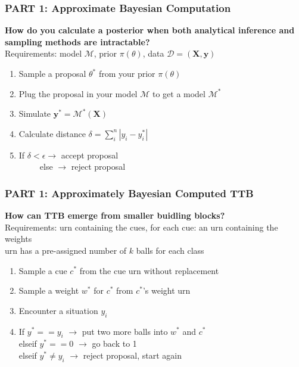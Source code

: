 \documentclass{beamer}
\begin{document}
\begin{frame}
 \frametitle{PART 1: Approximate Bayesian Computation}
\textbf{How do you calculate a posterior when both analytical inference and sampling methods are intractable?}\medskip\\
Requirements: model $\mathcal{M}$, prior $\pi(\theta)$, data $\mathcal{D}=(\mathbf{X},\mathbf{y})$
\begin{enumerate}
\item Sample a proposal $\theta^*$ from your prior $\pi(\theta)$
\item Plug the proposal in your model $\mathcal{M}$ to get a model $\mathcal{M}^*$
\item Simulate $\mathbf{y}^*=\mathcal{M}^*(\mathbf{X})$
\item Calculate distance $\delta=\sum_i^n |y_i-y_i^*|$
\item If $\delta<\epsilon \rightarrow$ accept proposal \\
~~~~~else $\rightarrow$ reject proposal
\end{enumerate}
\end{frame}

\begin{frame}
 \frametitle{PART 1: Approximately Bayesian Computed TTB}
\textbf{How can TTB emerge from smaller buidling blocks?}\medskip\\
Requirements: urn containing the cues, for each cue: an urn containing the weights\\
urn has a pre-assigned number of $k$ balls for each class
\begin{enumerate}
\item Sample a cue $c^*$ from the cue urn without replacement
\item Sample a weight $w^*$ for $c^*$ from $c^*$'s weight urn
\item Encounter a situation $y_i$
\item If $y^*==y_i$ $\rightarrow$ put two more balls into $w^*$ and $c^*$\\
elseif $y^*==0$ $\rightarrow$ go back to 1\\
elseif $y^*\neq y_i$ $\rightarrow$ reject proposal, start again
\end{enumerate}
\end{frame}
\end{document}

